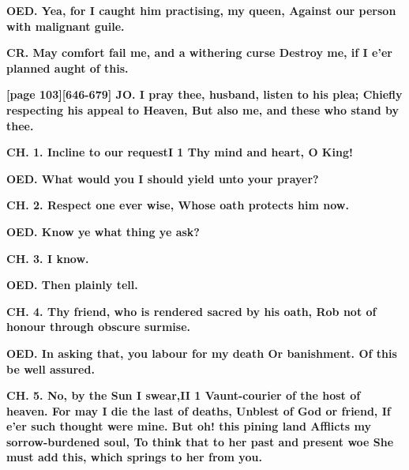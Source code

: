 \documentclass[11pt,letter]{book}
\begin{document}
\par \textbf{OED. Yea, for I caught him practising, my queen, Against our person with malignant guile.}
\par 

\par \textbf{CR. May comfort fail me, and a withering curse Destroy me, if I e’er planned aught of this.}
\par 

\par \textbf{[page 103][646-679] JO. I pray thee, husband, listen to his plea; Chiefly respecting his appeal to Heaven, But also me, and these who stand by thee.}
\par 

\par \textbf{CH. 1. Incline to our requestI 1 Thy mind and heart, O King!}
\par 

\par \textbf{OED. What would you I should yield unto your prayer?}
\par 

\par \textbf{CH. 2. Respect one ever wise, Whose oath protects him now.}
\par 

\par \textbf{OED. Know ye what thing ye ask?}
\par 

\par \textbf{CH. 3. I know.}
\par 

\par \textbf{OED. Then plainly tell.}
\par 

\par \textbf{CH. 4. Thy friend, who is rendered sacred by his oath, Rob not of honour through obscure surmise.}
\par 

\par \textbf{OED. In asking that, you labour for my death Or banishment. Of this be well assured.}
\par 

\par \textbf{CH. 5. No, by the Sun I swear,II 1 Vaunt-courier of the host of heaven. For may I die the last of deaths, Unblest of God or friend, If e’er such thought were mine. But oh! this pining land Afflicts my sorrow-burdened soul, To think that to her past and present woe She must add this, which springs to her from you.}
\par 
\end{document}
